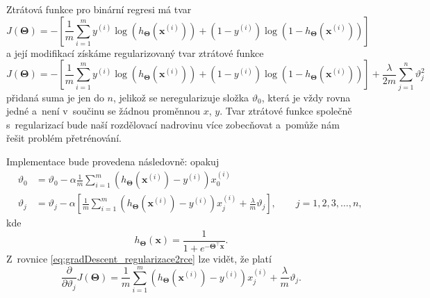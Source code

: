 \par{Ztrátová funkce pro binární regresi má tvar
\begin{equation}
	J \left( \bm{\Theta} \right) =  - \left[ \frac{1}{m} \sum_{i = 1}^{m} y^{ \left( i \right)} \log \left( h_{\bm{\Theta}} \left( \bm{x}^{\left( i \right)} \right) \right) + \left( 1 - y^{\left( i \right)} \right) \log \left( 1 - h_{\bm{\Theta}} \left( \bm{x}^{\left( i \right)} \right) \right) \right]
\end{equation}
a její modifikací získáme regularizovaný tvar ztrátové funkce
\begin{equation}
	J \left( \bm{\Theta} \right) =  - \left[ \frac{1}{m} \sum_{i = 1}^{m} y^{ \left( i \right)} \log \left( h_{\bm{\Theta}} \left( \bm{x}^{\left( i \right)} \right) \right) + \left( 1 - y^{\left( i \right)} \right) \log \left( 1 - h_{\bm{\Theta}} \left( \bm{x}^{\left( i \right)} \right) \right) \right] + \frac{\lambda}{2m} \sum_{j = 1}^{n} \vartheta_j^2
\end{equation}
přidaná suma je jen do $n$, jelikož se neregularizuje složka $\vartheta_0$, která je vždy rovna jedné a~není v~součinu se žádnou proměnnou $x$, $y$. Tvar ztrátové funkce společně s~regularizací bude naší rozdělovací nadrovinu více zobecňovat a~pomůže nám řešit problém přetrénování.}

\par{Implementace bude provedena následovně: opakuj
\begin{eqnarray}
	&\vartheta_0 &= \vartheta_0 - \alpha \frac{1}{m} \sum_{i = 1}^{m} \left( h_{\bm{\Theta}} \left( \bm{x}^{\left( i \right)} \right) - y^{\left( i \right)} \right) x_0^{\left( i \right)}\\
	&\vartheta_j &= \vartheta_j - \alpha \left[ \frac{1}{m} \sum_{i = 1}^{m} \left( h_{\bm{\Theta}} \left( \bm{x}^{\left( i \right)} \right) - y^{\left( i \right)} \right) x_j^{\left( i \right)} + \frac{\lambda}{m} \vartheta_j \right], \qquad j = 1, 2, 3, \ldots , n,
	\label{eq:gradDescent_regularizace2rce}
\end{eqnarray}
kde 
\begin{equation}
	h_{\bm{\Theta}} \left( \bm{x} \right) = \frac{1}{1 + e^{- \bm{\Theta}^{\top} \bm{x} }}.
\end{equation}
Z~rovnice \ref{eq:gradDescent_regularizace2rce} lze vidět, že platí
\begin{equation}
	\frac{\partial}{\partial \vartheta_j} J \left( \bm{\Theta} \right) = \frac{1}{m} \sum_{i = 1}^{m} \left( h_{\bm{\Theta}} \left( \bm{x}^{\left( i \right)} \right) - y^{\left( i \right)} \right) x_j^{\left( i \right)} + \frac{\lambda}{m} \vartheta_j.
\end{equation}}





